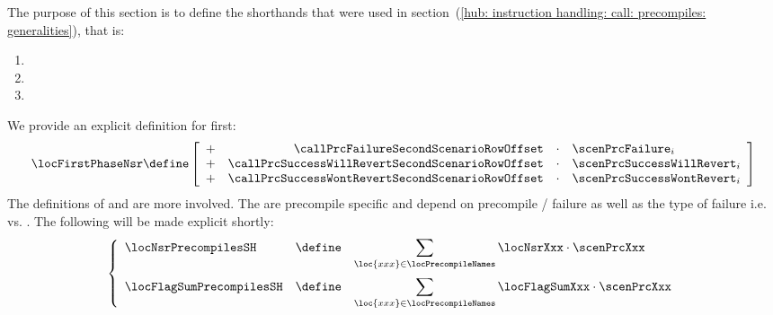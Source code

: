 The purpose of this section is to define the shorthands that were used in section~(\ref{hub: instruction handling: call: precompiles: generalities}), that is:
\begin{multicols}{3}
	\begin{enumerate}
		\item \locFirstPhaseNsr{}
		\item \locFlagSumPrecompilesSH{}
		\item \locNsrPrecompilesSH{}
	\end{enumerate}
\end{multicols}
\noindent We provide an explicit definition for \locFirstPhaseNsr{} first:
\[
	\locFirstPhaseNsr
	\define
	\left[ \begin{array}{lrcl}
		+ & \callPrcFailureSecondScenarioRowOffset           & \cdot & \scenPrcFailure           _{i} \\
		+ & \callPrcSuccessWillRevertSecondScenarioRowOffset & \cdot & \scenPrcSuccessWillRevert _{i} \\
		+ & \callPrcSuccessWontRevertSecondScenarioRowOffset & \cdot & \scenPrcSuccessWontRevert _{i} \\
	\end{array} \right]
\]
The definitions of \locFlagSumPrecompilesSH{} and \locNsrPrecompilesSH{} are more involved.
The are precompile specific and depend on precompile \scenPrcSuccess{} / failure as well as the type of failure i.e.
\scenPrcFailureKnownToHub{} vs.
\scenPrcFailureKnownToRam{}.
The following will be made explicit shortly: 
\[
	\left\{ \begin{array}{lcl}
		\locNsrPrecompilesSH     & \define & \displaystyle \sum _{\loc{xxx} \in \locPrecompileNames} \locNsrXxx     \cdot \scenPrcXxx \vspace{2mm} \\
		\locFlagSumPrecompilesSH & \define & \displaystyle \sum _{\loc{xxx} \in \locPrecompileNames} \locFlagSumXxx \cdot \scenPrcXxx \\
	\end{array} \right.
\]
